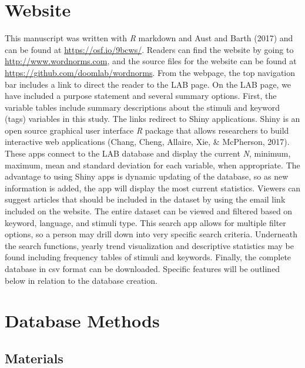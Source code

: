 \documentclass[english,man]{apa6}
\theoremstyle{definition}
\theoremstyle{definition}
\theoremstyle{definition}
\theoremstyle{remark}
\begin{document}
\section{Website}\label{website}

This manuscript was written with \emph{R} markdown and Aust and Barth
(2017) and can be found at \url{https://osf.io/9bcws/}. Readers can find
the website by going to \url{http://www.wordnorms.com}, and the source
files for the website can be found at
\url{https://github.com/doomlab/wordnorms}. From the webpage, the top
navigation bar includes a link to direct the reader to the LAB page. On
the LAB page, we have included a purpose statement and several summary
options. First, the variable tables include summary descriptions about
the stimuli and keyword (tags) variables in this study. The links
redirect to Shiny applications. Shiny is an open source graphical user
interface \emph{R} package that allows researchers to build interactive
web applications (Chang, Cheng, Allaire, Xie, \& McPherson, 2017). These
apps connect to the LAB database and display the current \emph{N},
minimum, maximum, mean and standard deviation for each variable, when
appropriate. The advantage to using Shiny apps is dynamic updating of
the database, so as new information is added, the app will display the
most current statistics. Viewers can suggest articles that should be
included in the dataset by using the email link included on the website.
The entire dataset can be viewed and filtered based on keyword,
language, and stimuli type. This search app allows for multiple filter
options, so a person may drill down into very specific search criteria.
Underneath the search functions, yearly trend visualization and
descriptive statistics may be found including frequency tables of
stimuli and keywords. Finally, the complete database in csv format can
be downloaded. Specific features will be outlined below in relation to
the database creation.

\section{Database Methods}\label{database-methods}

\subsection{Materials}\label{materials}
\end{document}
